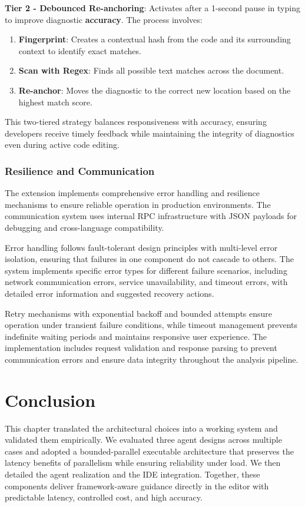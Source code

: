 \begin{spacing}{1.2}
\textbf{Tier 2 - Debounced Re-anchoring}: Activates after a 1-second pause in typing to improve diagnostic \textbf{accuracy}. The process involves:  
\begin{enumerate}
    \item \textbf{Fingerprint}: Creates a contextual hash from the code and its surrounding context to identify exact matches.  
    \item \textbf{Scan with Regex}: Finds all possible text matches across the document.  
    \item \textbf{Re-anchor}: Moves the diagnostic to the correct new location based on the highest match score.  
\end{enumerate}  

This two-tiered strategy balances responsiveness with accuracy, ensuring developers receive timely feedback while maintaining the integrity of diagnostics even during active code editing.


\subsubsection{Resilience and Communication}
The extension implements comprehensive error handling and resilience mechanisms to ensure reliable operation in production environments. The communication system uses internal RPC infrastructure with JSON payloads for debugging and cross-language compatibility.

Error handling follows fault-tolerant design principles with multi-level error isolation, ensuring that failures in one component do not cascade to others. The system implements specific error types for different failure scenarios, including network communication errors, service unavailability, and timeout errors, with detailed error information and suggested recovery actions.

Retry mechanisms with exponential backoff and bounded attempts ensure operation under transient failure conditions, while timeout management prevents indefinite waiting periods and maintains responsive user experience. The implementation includes request validation and response parsing to prevent communication errors and ensure data integrity throughout the analysis pipeline.


\section*{Conclusion}
This chapter translated the architectural choices into a working system and validated them empirically. We evaluated three agent designs across multiple cases and adopted a bounded-parallel executable architecture that preserves the latency benefits of parallelism while ensuring reliability under load. We then detailed the agent realization and the IDE integration. Together, these components deliver framework-aware guidance directly in the editor with predictable latency, controlled cost, and high accuracy.

\end{spacing}